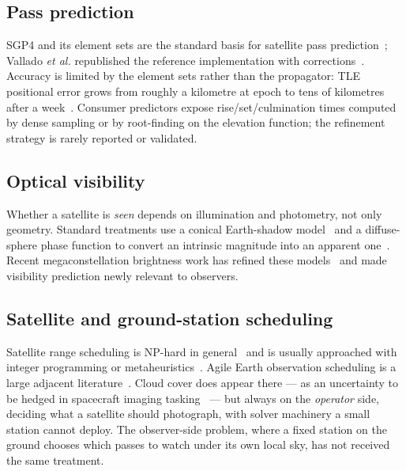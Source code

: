 \documentclass[conference]{IEEEtran}
\begin{document}
\subsection{Pass prediction}
SGP4 and its element sets are the standard basis for satellite pass
prediction~\cite{hoots1980spacetrack}; Vallado \emph{et al.} republished the
reference implementation with corrections~\cite{vallado2006revisiting}. Accuracy
is limited by the element sets rather than the propagator: TLE positional error
grows from roughly a kilometre at epoch to tens of kilometres after a
week~\cite{kelso2007validation, wang2009accuracy}. Consumer predictors expose
rise/set/culmination times computed by dense sampling or by root-finding on the
elevation function; the refinement strategy is rarely reported or validated.

\subsection{Optical visibility}
Whether a satellite is \emph{seen} depends on illumination and photometry, not
only geometry. Standard treatments use a conical Earth-shadow
model~\cite{vallado2013fundamentals} and a diffuse-sphere phase function to
convert an intrinsic magnitude into an apparent one~\cite{hejduk2011phase}.
Recent megaconstellation brightness work has refined these
models~\cite{mallama2021starlink, lawler2022visibility} and made
visibility prediction newly relevant to observers.

\subsection{Satellite and ground-station scheduling}
Satellite range scheduling is NP-hard in general~\cite{vazquez2015ground} and is
usually approached with integer programming or
metaheuristics~\cite{barbulescu2004satellite, marinelli2011lagrangian,
spangelo2015optimization, chen2019mixed, song2019learning}. Agile Earth
observation scheduling is a large adjacent literature~\cite{lemaitre2002selecting,
wang2011priority, wang2020review}. Cloud cover does appear there --- as an
uncertainty to be hedged in spacecraft imaging
tasking~\cite{wang2019cloud, valicka2019mixed} --- but always on the
\emph{operator} side, deciding what a satellite should photograph, with
solver machinery a small station cannot deploy. The observer-side problem, where
a fixed station on the ground chooses which passes to watch under its own local
sky, has not received the same treatment.
\end{document}
